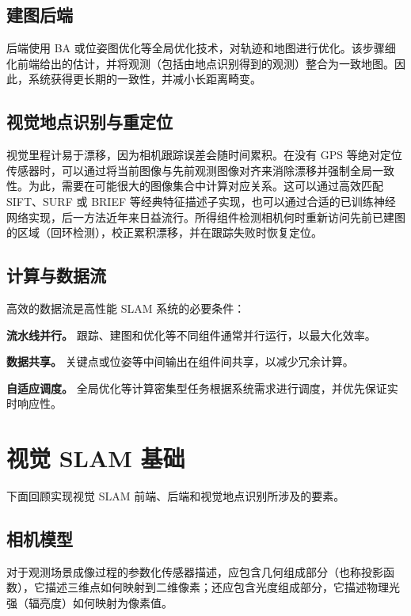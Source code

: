 \subsection{建图后端}

后端使用 BA 或位姿图优化等全局优化技术，对轨迹和地图进行优化。该步骤细化前端给出的估计，并将观测（包括由地点识别得到的观测）整合为一致地图。因此，系统获得更长期的一致性，并减小长距离畸变。

\subsection{视觉地点识别与重定位}

视觉里程计易于漂移，因为相机跟踪误差会随时间累积。在没有 GPS 等绝对定位传感器时，可以通过将当前图像与先前观测图像对齐来消除漂移并强制全局一致性。为此，需要在可能很大的图像集合中计算对应关系。这可以通过高效匹配 SIFT、SURF 或 BRIEF 等经典特征描述子实现，也可以通过合适的已训练神经网络实现，后一方法近年来日益流行。所得组件检测相机何时重新访问先前已建图的区域（回环检测），校正累积漂移，并在跟踪失败时恢复定位。

\subsection{计算与数据流}

高效的数据流是高性能 SLAM 系统的必要条件：

\textbf{流水线并行。} 跟踪、建图和优化等不同组件通常并行运行，以最大化效率。

\textbf{数据共享。} 关键点或位姿等中间输出在组件间共享，以减少冗余计算。

\textbf{自适应调度。} 全局优化等计算密集型任务根据系统需求进行调度，并优先保证实时响应性。

\section{视觉 SLAM 基础}

下面回顾实现视觉 SLAM 前端、后端和视觉地点识别所涉及的要素。

\subsection{相机模型}

对于观测场景成像过程的参数化传感器描述，应包含几何组成部分（也称投影函数），它描述三维点如何映射到二维像素；还应包含光度组成部分，它描述物理光强（辐亮度）如何映射为像素值。

